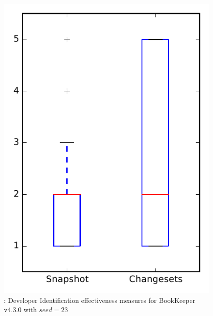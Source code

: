 
\begin{figure}
\centering
\includegraphics[height=0.4\textheight]{figures/dit_seed/rq1_bookkeeper_23}
\caption{\rtwo: Developer Identification effectiveness measures for BookKeeper v4.3.0 with $seed=23$}
\label{fig:dit_seed:rq1:bookkeeper}
\end{figure}

